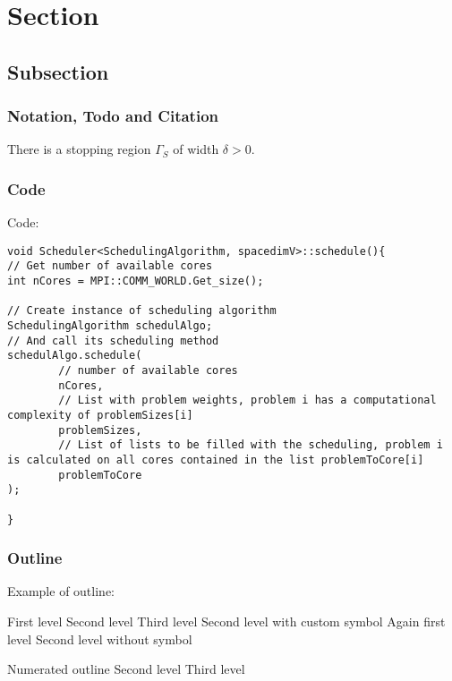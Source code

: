 \section{Section}
\label{section}

\subsection{Subsection}
\label{subsection}

\subsubsection{Notation, Todo and Citation}
\label{notation}
There is a stopping region $\Gamma_S$  of width $\delta>0$. 
\cite{boehme}

\subsubsection{Code}
Code:
\begin{lstlisting}
void Scheduler<SchedulingAlgorithm, spacedimV>::schedule(){
// Get number of available cores
int nCores = MPI::COMM_WORLD.Get_size();

// Create instance of scheduling algorithm
SchedulingAlgorithm schedulAlgo;
// And call its scheduling method
schedulAlgo.schedule( 
        // number of available cores
        nCores,
        // List with problem weights, problem i has a computational complexity of problemSizes[i]
        problemSizes,
        // List of lists to be filled with the scheduling, problem i is calculated on all cores contained in the list problemToCore[i]
        problemToCore
);

}
\end{lstlisting}

\subsubsection{Outline}
Example of outline:
\begin{outline}
    \1 First level
        \2 Second level
            \3 Third level
        \2[+] Second level with custom symbol
    \1 Again first level
        \2[] Second level without symbol
\end{outline}
\begin{outline}[enumerate]
    \1 Numerated outline
        \2 Second level
            \3 Third level
\end{outline}

